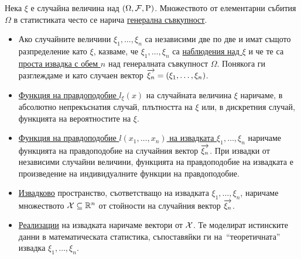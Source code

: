 \documentclass[numbers=endperiod, DIV=15, bibliography=totocnumbered]{scrartcl}
\begin{document}
\begin{definition}[Извадки]
  Нека $\xi$ е случайна величина над $(\Omega, \mathcal{F}, \operatorname{P})$. Множеството от елементарни събития $\Omega$ в статистиката често се нарича \uline{генерална съвкупност}.

  \begin{itemize}
    \item Ако случайните величини $\xi_1, \ldots, \xi_n$ са независими две по две и имат същото разпределение като $\xi$, казваме, че $\xi_1, \ldots, \xi_n$ са \uline{наблюдения над $\xi$} и че те са \uline{проста извадка с обем $n$} над генералната съвкупност $\Omega$. Понякога ги разглеждаме и като случаен вектор $\overrightarrow{\xi_n} = (\xi_1, \ldots, \xi_n)$.
    \item \uline{Функция на правдоподобие $l_\xi(x)$} на случайната величина $\xi$ наричаме, в абсолютно непрекъснатия случай, плътността на $\xi$ или, в дискретния случай, функцията на вероятностите на $\xi$.
    \item \uline{Функция на правдоподобие $l(x_1, \ldots, x_n)$ на извадката $\xi_1, \ldots, \xi_n$} наричаме функцията на правдоподобие на случайния вектор $\overrightarrow{\xi_n}$. При извадки от независими случайни величини, функцията на правдоподобие на извадката е произведение на индивидуалните функции на правдоподобие.
    \item \uline{Извадково} пространство, съответстващо на извадката $\xi_1, \ldots, \xi_n$, наричаме множеството $\mathcal{X} \subseteq \mathbb{R}^n$ от стойности на случайния вектор $\overrightarrow{\xi_n}$.
    \item \uline{Реализации} на извадката наричаме вектори от $\mathcal{X}$. Те моделират истинските данни в математическата статистика, съпоставяйки ги на~\enquote{теоретичната} извадка $\xi_1, \ldots, \xi_n$.
  \end{itemize}
\end{definition}
\end{document}
